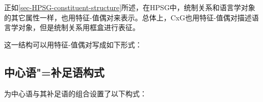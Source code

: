 正如\ref{sec-HPSG-constituent-structure}所述，在HPSG中，统制关系和语言学对象的其它属性一样，也用特征-值偶对来表示。总体上，CxG也用特征-值偶对描述语言学对象，但是统制关系用框盒进行表征\citep{KF99a,Goldberg2003a}。

\ea
\setlength{\fboxsep}{2mm}
\z
这一结构可以用特征-值偶对写成如下形式：

\ea
{}
\z

\subsection{中心语"=补足语构式}

\citet{KF99a}为中心语与其补足语的组合设置了以下构式：

